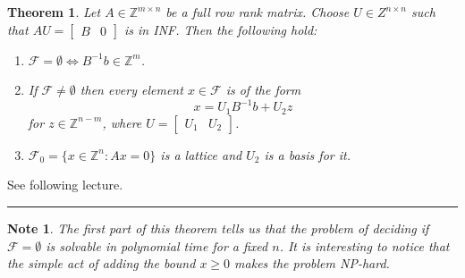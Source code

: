 \documentclass[11pt]{article}
\newenvironment{proof}{{\bf Proof:  }}{\hfill\rule{2mm}{2mm}}
\newtheorem{theorem}[fact]{Theorem}
\newtheorem{note}[fact]{Note}
\newcommand{\Z}{\ensuremath{\mathbb Z}}
\begin{document}
\begin{theorem}
Let $A \in \Z^{m \times n}$ be a full row rank matrix. Choose $U \in Z^{n\times n}$ such that $AU = \begin{bmatrix} B & 0 \end{bmatrix}$ is in INF. Then the following hold:
\begin{enumerate}
\item $\mathcal{F} = \emptyset \iff B^{-1}b \in \Z^m$.
\item If $\mathcal{F} \neq \emptyset$ then every element $x \in \mathcal{F}$ is of the form
$$x = U_1 B^{-1}b + U_2z$$
for $z \in \Z^{n-m}$, where $U = \begin{bmatrix} U_1 & U_2 \end{bmatrix}$.
\item $\mathcal{F}_0 = \{x \in \Z^n: Ax=0\}$ is a lattice and $U_2$ is a basis for it.
\end{enumerate}
\end{theorem}
\begin{proof}
See following lecture.
\end{proof}
\begin{note}
The first part of this theorem tells us that the problem of deciding if $\mathcal{F} = \emptyset$ is solvable in polynomial time for a fixed $n$. It is interesting to notice that the simple act of adding the bound $x \geq 0$ makes the problem NP-hard.
\end{note}
\end{document}
